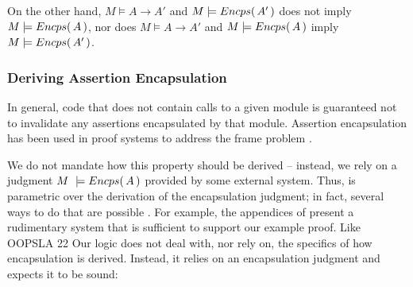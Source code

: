 On the other hand,  $M \models A \rightarrow A'$ and $ M \models  {\ensuremath Encps(\, {A'}\, )}$ does not  imply \ $M \models  {\ensuremath Encps(\, A\, )}$, nor does
$M \models A \rightarrow A'$ and 
 $ M \models  {\ensuremath Encps(\, {A}\, )}$ imply \ $M \models  {\ensuremath Encps(\, A'\, )}$.

%

\subsubsection{Deriving  Assertion Encapsulation}

{In general},  code that does not contain 
calls to a {given} module is guaranteed not to invalidate any assertions encapsulated by that module.
 Assertion encapsulation has been used in proof systems to {address}   the  {frame} problem
 \cite{objInvars,encaps}. 

We  do not mandate how this property should be derived -- instead, we rely on a judgment 
$M\ \models  \encaps{A}$ provided by some external system. 
Thus, \SpecLang is parametric over the derivation of the encapsulation
     judgment; in fact, several ways to do that are possible \cite{TAME2003,ownEncaps,objInvars}. For example,
 the appendices of
    \cite{necessityFull} present a 
    rudimentary system that is sufficient to support our example
    proof.   Like OOPSLA 22 Our logic does not {deal with, nor} rely on, the specifics of  how   encapsulation
{is derived}.
{Instead, it relies} on an encapsulation judgment and expects it to be sound:

